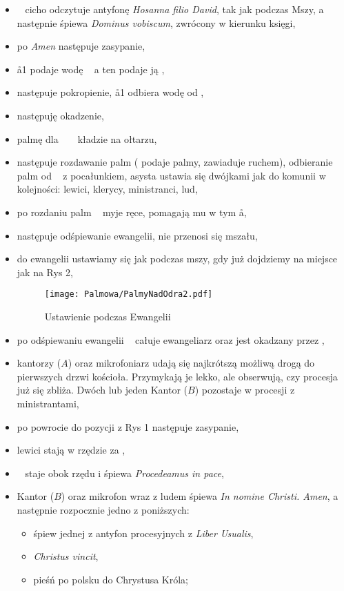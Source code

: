 \begin{itemize}
	\item \ii~ cicho odczytuje antyfonę \textit{Hosanna filio David}, tak jak
	      podczas Mszy, a następnie śpiewa \textit{Dominus vobiscum}, zwrócony w
	      kierunku księgi,
	\item po \textit{Amen} następuje zasypanie,
	\item \aa1 podaje wodę \cc~ a ten podaje ją \dd,
	\item następuje pokropienie, \aa1 odbiera wodę od \dd,
	\item następuję okadzenie,
	\item palmę dla \ii~ \dd~ kładzie na ołtarzu,
	\item następuje rozdawanie palm ( podaje palmy,  zawiaduje ruchem),
	      odbieranie palm od \ii~ z pocałunkiem, asysta ustawia się dwójkami jak
	      do komunii w kolejności: lewici, klerycy, ministranci, lud,
	\item po rozdaniu palm \ii~ myje ręce, pomagają mu w tym \aa,
	\item następuje odśpiewanie ewangelii, nie przenosi się mszału,
	\item do ewangelii ustawiamy się jak podczas mszy, gdy już dojdziemy na
	      miejsce jak na Rys 2,

	      \begin{figure}[h!]
		      \centering
		      \texttt{[image: Palmowa/PalmyNadOdra2.pdf]}
		      \caption{Ustawienie podczas Ewangelii}
	      \end{figure}

	\item po odśpiewaniu ewangelii \ii~ całuje ewangeliarz oraz jest okadzany
	      przez \dd,
	\item kantorzy ($A$) oraz mikrofoniarz udają się najkrótszą możliwą drogą do
	      pierwszych drzwi kościoła. Przymykają je lekko, ale obserwują, czy
	      procesja już się zbliża. Dwóch lub jeden Kantor ($B$) pozostaje w
	      procesji z ministrantami,
	\item po powrocie do pozycji z Rys 1 następuje zasypanie,
	\item lewici stają w rzędzie za	\ii,
	\item \dd~ staje obok rzędu i śpiewa \textit{Procedeamus in pace},
	\item Kantor ($B$) oraz mikrofon wraz z ludem śpiewa \textit{In nomine
		      Christi. Amen}, a następnie rozpocznie jedno z poniższych:

	      \begin{itemize}
		      \item śpiew jednej z antyfon procesyjnych z \textit{Liber
			            Usualis},
		      \item \textit{Christus vincit},
		      \item pieśń po polsku do Chrystusa Króla;
	      \end{itemize}


\end{itemize}
